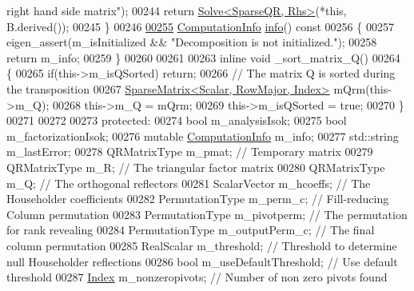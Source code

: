 \begin{DoxyCode}
{       right hand side matrix"});
00244           \textcolor{keywordflow}{return} \hyperlink{group___core___module_class_eigen_1_1_solve}{Solve<SparseQR, Rhs>}(*\textcolor{keyword}{this}, B.derived());
00245     \}
00246     
\hyperlink{group___sparse_q_r___module_a234b0580aaf57237393f2e73a3d38690}{00255}     \hyperlink{group__enums_ga85fad7b87587764e5cf6b513a9e0ee5e}{ComputationInfo} \hyperlink{group___sparse_q_r___module_a234b0580aaf57237393f2e73a3d38690}{info}()\textcolor{keyword}{ const}
00256 \textcolor{keyword}{    }\{
00257       eigen\_assert(m\_isInitialized && \textcolor{stringliteral}{"Decomposition is not initialized."});
00258       \textcolor{keywordflow}{return} m\_info;
00259     \}
00260 
00261 
00263     \textcolor{keyword}{inline} \textcolor{keywordtype}{void} \_sort\_matrix\_Q()
00264     \{
00265       \textcolor{keywordflow}{if}(this->m\_isQSorted) \textcolor{keywordflow}{return};
00266       \textcolor{comment}{// The matrix Q is sorted during the transposition}
00267       \hyperlink{group___sparse_core___module_class_eigen_1_1_sparse_matrix}{SparseMatrix<Scalar, RowMajor, Index>} mQrm(this->m\_Q);
00268       this->m\_Q = mQrm;
00269       this->m\_isQSorted = \textcolor{keyword}{true};
00270     \}
00271 
00272     
00273   \textcolor{keyword}{protected}:
00274     \textcolor{keywordtype}{bool} m\_analysisIsok;
00275     \textcolor{keywordtype}{bool} m\_factorizationIsok;
00276     \textcolor{keyword}{mutable} \hyperlink{group__enums_ga85fad7b87587764e5cf6b513a9e0ee5e}{ComputationInfo} m\_info;
00277     std::string m\_lastError;
00278     QRMatrixType m\_pmat;            \textcolor{comment}{// Temporary matrix}
00279     QRMatrixType m\_R;               \textcolor{comment}{// The triangular factor matrix}
00280     QRMatrixType m\_Q;               \textcolor{comment}{// The orthogonal reflectors}
00281     ScalarVector m\_hcoeffs;         \textcolor{comment}{// The Householder coefficients}
00282     PermutationType m\_perm\_c;       \textcolor{comment}{// Fill-reducing  Column  permutation}
00283     PermutationType m\_pivotperm;    \textcolor{comment}{// The permutation for rank revealing}
00284     PermutationType m\_outputPerm\_c; \textcolor{comment}{// The final column permutation}
00285     RealScalar m\_threshold;         \textcolor{comment}{// Threshold to determine null Householder reflections}
00286     \textcolor{keywordtype}{bool} m\_useDefaultThreshold;     \textcolor{comment}{// Use default threshold}
00287     \hyperlink{namespace_eigen_a62e77e0933482dafde8fe197d9a2cfde}{Index} m\_nonzeropivots;          \textcolor{comment}{// Number of non zero pivots found}

\end{DoxyCode}
